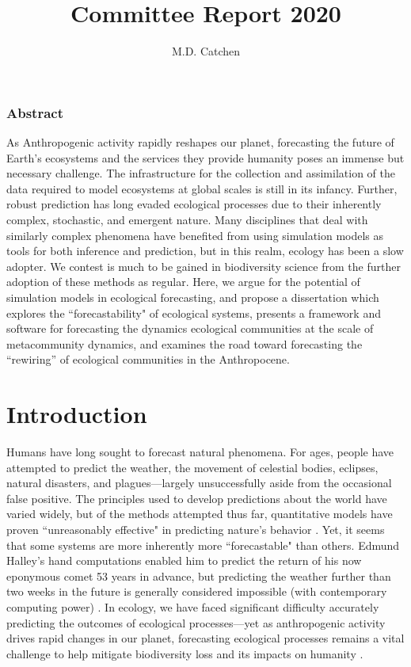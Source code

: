 \documentclass[]{article}
\title{Committee Report 2020}
\author{M.D. Catchen}
\date{}
\begin{document}
\maketitle

\vspace{3em}
\subsubsection*{Abstract}

As Anthropogenic activity rapidly reshapes our planet, forecasting the future of Earth's ecosystems and the services they provide humanity poses an immense but necessary challenge. The infrastructure for the collection and assimilation of the data required to model ecosystems at global scales is still in its infancy. Further, robust prediction has long evaded ecological processes due to their inherently complex, stochastic, and emergent nature.
Many disciplines that deal with similarly complex phenomena have benefited from using simulation models as tools for both inference and prediction, but in this realm, ecology has been a slow adopter. We contest is much to be gained in biodiversity science from the further adoption of these methods as regular.
Here, we argue for the potential of simulation models in ecological forecasting, and propose a dissertation which explores the ``forecastability" of ecological systems, presents a framework and software for forecasting the dynamics ecological communities at the scale of metacommunity dynamics, and examines the road toward forecasting the ``rewiring'' of ecological communities in the Anthropocene.

    
\clearpage
\section{Introduction}

Humans have long sought to forecast natural phenomena. For ages, people have attempted to predict the weather, the movement of celestial bodies,  eclipses, natural disasters, and plagues---largely unsuccessfully aside from the occasional false positive. The principles used to develop predictions about the world have varied widely, but of the methods attempted thus far, quantitative models have proven ``unreasonably effective" in predicting nature's behavior \cite{unreasonable_effectiveness}. Yet, it seems that some systems are more inherently more ``forecastable" than others.
Edmund Halley's hand computations enabled him to predict the return of his now eponymous comet 53 years in advance, but predicting the weather further than two weeks in the future is generally considered impossible (with contemporary computing power) \cite{numerical_weather}. 
In ecology, we have faced significant difficulty accurately predicting the outcomes of ecological processes---yet as anthropogenic activity drives rapid changes in our planet, forecasting ecological processes remains a vital challenge to help mitigate biodiversity loss and its impacts on humanity \cite{dietze_forecasting_2019, pereira2010scenarios}.
\end{document}
